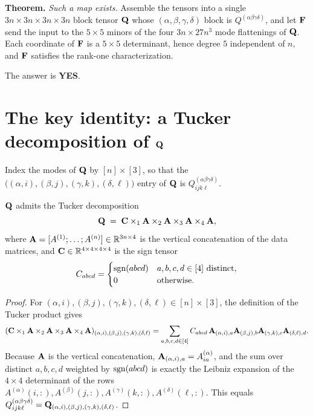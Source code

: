 \documentclass[11pt]{article}
\begin{document}
\medskip
\noindent\textbf{Theorem.} \emph{Such a map exists.} Assemble the tensors into
a single $3n\times3n\times3n\times3n$ block tensor $\mathbf{Q}$ whose
$(\alpha,\beta,\gamma,\delta)$ block is $Q^{(\alpha\beta\gamma\delta)}$, and let
$\mathbf{F}$ send the input to the $5\times5$ minors of the four
$3n\times27n^{3}$ mode flattenings of $\mathbf{Q}$. Each coordinate of $\mathbf{F}$ is a
$5\times5$ determinant, hence degree $5$ independent of $n$, and $\mathbf{F}$
satisfies the rank-one characterization.

\medskip
\noindent The answer is \textbf{YES}.

\section*{The key identity: a Tucker decomposition of \texorpdfstring{$\mathbf{Q}$}{Q}}

Index the modes of $\mathbf{Q}$ by $[n]\times[3]$, so that the
$\bigl((\alpha,i),(\beta,j),(\gamma,k),(\delta,\ell)\bigr)$ entry of $\mathbf{Q}$ is
$Q^{(\alpha\beta\gamma\delta)}_{ijk\ell}$.

\begin{qninelemma}\label{lem:tucker}
$\mathbf{Q}$ admits the Tucker decomposition
\begin{equation}\label{eq:tucker}
  \mathbf{Q} \;=\; \mathbf{C}\times_1\mathbf{A}\times_2\mathbf{A}\times_3\mathbf{A}\times_4\mathbf{A},
\end{equation}
where $\mathbf{A}=[A^{(1)};\dots;A^{(n)}]\in\mathbb{R}^{3n\times4}$ is the vertical
concatenation of the data matrices, and $\mathbf{C}\in\mathbb{R}^{4\times4\times4\times4}$ is
the sign tensor
\[
  C_{abcd}=\begin{cases}\operatorname{sgn}(abcd) & a,b,c,d\in[4]\text{ distinct},\\ 0 & \text{otherwise.}\end{cases}
\]
\end{qninelemma}

\begin{proof}
For $(\alpha,i),(\beta,j),(\gamma,k),(\delta,\ell)\in[n]\times[3]$, the
definition of the Tucker product gives
\[
  (\mathbf{C}\times_1\mathbf{A}\times_2\mathbf{A}\times_3\mathbf{A}\times_4\mathbf{A})_{(\alpha,i),(\beta,j),(\gamma,k),(\delta,\ell)}
  =\sum_{a,b,c,d\in[4]}C_{abcd}\,\mathbf{A}_{(\alpha,i),a}\mathbf{A}_{(\beta,j),b}\mathbf{A}_{(\gamma,k),c}\mathbf{A}_{(\delta,\ell),d}.
\]
Because $\mathbf{A}$ is the vertical concatenation, $\mathbf{A}_{(\alpha,i),a}=A^{(\alpha)}_{ia}$,
and the sum over distinct $a,b,c,d$ weighted by $\operatorname{sgn}(abcd)$ is exactly the
Leibniz expansion of the $4\times4$ determinant of the rows
$A^{(\alpha)}(i,:),A^{(\beta)}(j,:),A^{(\gamma)}(k,:),A^{(\delta)}(\ell,:)$.
This equals $Q^{(\alpha\beta\gamma\delta)}_{ijk\ell}=\mathbf{Q}_{(\alpha,i),(\beta,j),(\gamma,k),(\delta,\ell)}$.
\end{proof}
\end{document}
